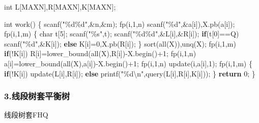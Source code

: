 \documentclass[
]{article}
\newenvironment{Shaded}{}{}
\newcommand{\CharTok}[1]{\textcolor[rgb]{0.25,0.44,0.63}{#1}}
\newcommand{\ControlFlowTok}[1]{\textcolor[rgb]{0.00,0.44,0.13}{\textbf{#1}}}
\newcommand{\DataTypeTok}[1]{\textcolor[rgb]{0.56,0.13,0.00}{#1}}
\newcommand{\DecValTok}[1]{\textcolor[rgb]{0.25,0.63,0.44}{#1}}
\newcommand{\NormalTok}[1]{#1}
\newcommand{\SpecialCharTok}[1]{\textcolor[rgb]{0.25,0.44,0.63}{#1}}
\newcommand{\StringTok}[1]{\textcolor[rgb]{0.25,0.44,0.63}{#1}}
\begin{document}
\begin{Shaded}
\begin{Highlighting}[]
\DataTypeTok{int}\NormalTok{ L[MAXN],R[MAXN],K[MAXN];}

\DataTypeTok{int}\NormalTok{ work()}
\NormalTok{\{}
\NormalTok{    scanf(}\StringTok{"}\SpecialCharTok{\%d\%d}\StringTok{"}\NormalTok{,\&n,\&m);}
\NormalTok{    fp(i,}\DecValTok{1}\NormalTok{,n) scanf(}\StringTok{"}\SpecialCharTok{\%d}\StringTok{"}\NormalTok{,\&a[i]),X.pb(a[i]);}
\NormalTok{    fp(i,}\DecValTok{1}\NormalTok{,m)}
\NormalTok{    \{}
        \DataTypeTok{char}\NormalTok{ t[}\DecValTok{5}\NormalTok{];}
\NormalTok{        scanf(}\StringTok{"}\SpecialCharTok{\%s}\StringTok{"}\NormalTok{,t);}
\NormalTok{        scanf(}\StringTok{"}\SpecialCharTok{\%d\%d}\StringTok{"}\NormalTok{,\&L[i],\&R[i]);}
        \ControlFlowTok{if}\NormalTok{(t[}\DecValTok{0}\NormalTok{]==}\CharTok{\textquotesingle{}Q\textquotesingle{}}\NormalTok{) scanf(}\StringTok{"}\SpecialCharTok{\%d}\StringTok{"}\NormalTok{,\&K[i]);}
        \ControlFlowTok{else}\NormalTok{ K[i]=}\DecValTok{0}\NormalTok{,X.pb(R[i]);}
\NormalTok{    \}}
\NormalTok{    sort(all(X)),unq(X);}
\NormalTok{    fp(i,}\DecValTok{1}\NormalTok{,m) }\ControlFlowTok{if}\NormalTok{(!K[i]) R[i]=lower\_bound(all(X),R[i]){-}X.begin()+}\DecValTok{1}\NormalTok{;}
\NormalTok{    fp(i,}\DecValTok{1}\NormalTok{,n) a[i]=lower\_bound(all(X),a[i]){-}X.begin()+}\DecValTok{1}\NormalTok{;}
\NormalTok{    fp(i,}\DecValTok{1}\NormalTok{,n) update(i,a[i],}\DecValTok{1}\NormalTok{);}
\NormalTok{    fp(i,}\DecValTok{1}\NormalTok{,m)}
\NormalTok{    \{}
        \ControlFlowTok{if}\NormalTok{(!K[i]) update(L[i],R[i]);}
        \ControlFlowTok{else}\NormalTok{ printf(}\StringTok{"}\SpecialCharTok{\%d\textbackslash{}n}\StringTok{"}\NormalTok{,query(L[i],R[i],K[i]));}
\NormalTok{    \}}
    \ControlFlowTok{return} \DecValTok{0}\NormalTok{;}
\NormalTok{\}}
\end{Highlighting}
\end{Shaded}

\hypertarget{ux7ebfux6bb5ux6811ux5957ux5e73ux8861ux6811}{%
\subsubsection{3.线段树套平衡树}\label{ux7ebfux6bb5ux6811ux5957ux5e73ux8861ux6811}}

线段树套FHQ
\end{document}
